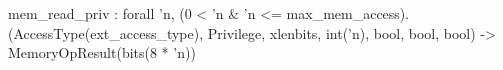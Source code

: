 mem_read_priv : forall 'n, (0 < 'n & 'n <= max_mem_access).
  (AccessType(ext_access_type), Privilege, xlenbits, int('n), bool, bool, bool) -> MemoryOpResult(bits(8 * 'n))